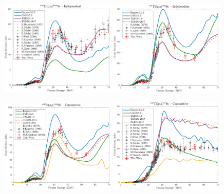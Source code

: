 \begin{figure}
 \centering
 \includegraphics[width=0.49\textwidth]{./figures/44mSc.pdf}
 \includegraphics[width=0.49\textwidth]{./figures/44gSc.pdf}
 
 \includegraphics[width=0.49\textwidth]{./figures/44Sc.pdf}
 \includegraphics[width=0.49\textwidth]{./figures/47Sc.pdf}
 

\end{figure}
